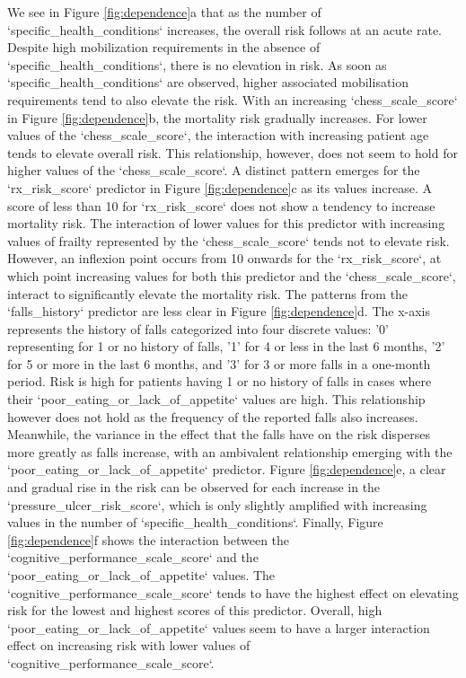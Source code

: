 \documentclass{article}
\begin{document}
We see in Figure \ref{fig:dependence}a that as the number of `specific\_health\_conditions` increases, the overall risk follows at an acute rate.  Despite high mobilization requirements in the absence of `specific\_health\_conditions`, there is no elevation in risk.  As soon as `specific\_health\_conditions` are observed, higher associated mobilisation requirements tend to also elevate the risk. With an increasing `chess\_scale\_score` in Figure \ref{fig:dependence}b, the mortality risk gradually increases. For lower values of the `chess\_scale\_score`, the interaction with increasing patient age tends to elevate overall risk. This relationship, however, does not seem to hold for higher values of the `chess\_scale\_score`. A distinct pattern emerges for the `rx\_risk\_score` predictor in Figure \ref{fig:dependence}c as its values increase. A score of less than 10 for `rx\_risk\_score` does not show a tendency to increase mortality risk. The interaction of lower values for this predictor with increasing values of frailty represented by the `chess\_scale\_score` tends not to elevate risk. However, an inflexion point occurs from 10 onwards for the `rx\_risk\_score`, at which point increasing values for both this predictor and the `chess\_scale\_score`, interact to significantly elevate the mortality risk. The patterns from the `falls\_history` predictor are less clear in Figure \ref{fig:dependence}d. The x-axis represents the history of falls categorized into four discrete values: '0' representing for 1 or no history of falls, '1' for 4 or less in the last 6 months, '2' for 5 or more in the last 6 months, and '3' for 3 or more falls in a one-month period. Risk is high for patients having 1 or no history of falls in cases where their `poor\_eating\_or\_lack\_of\_appetite` values are high. This relationship however does not hold as the frequency of the reported falls also increases. Meanwhile, the variance in the effect that the falls have on the risk disperses more greatly as falls increase, with an ambivalent relationship emerging with the `poor\_eating\_or\_lack\_of\_appetite` predictor. Figure \ref{fig:dependence}e, a clear and gradual rise in the risk can be observed for each increase in the `pressure\_ulcer\_risk\_score`, which is only slightly amplified with increasing values in the number of `specific\_health\_conditions`. Finally, Figure \ref{fig:dependence}f shows the interaction between the `cognitive\_performance\_scale\_score` and the `poor\_eating\_or\_lack\_of\_appetite` values. The `cognitive\_performance\_scale\_score` tends to have the highest effect on elevating risk for the lowest and highest scores of this predictor. Overall, high `poor\_eating\_or\_lack\_of\_appetite` values seem to have a larger interaction effect on increasing risk with lower values of `cognitive\_performance\_scale\_score`.
\end{document}
